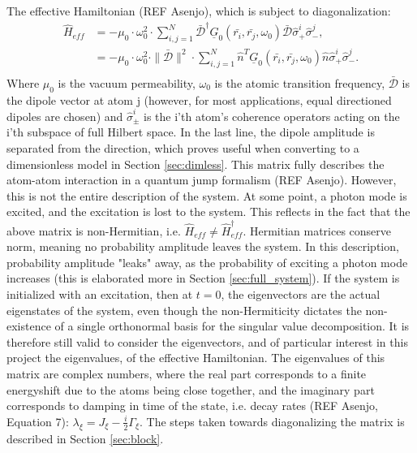 \documentclass{article}
\begin{document}
The effective Hamiltonian (REF Asenjo), which is subject to diagonalization:
\begin{equation}\label{eq:Heff}
    \begin{split}
        \hat{H}_{eff} &= - \mu_0 \cdot \omega_0^2 \cdot \sum_{i,j = 1}^N \bar{\mathscr{D}}^\dagger \underline{G}_0(\bar{r_i}, \bar{r_j}, \omega_0) \bar{\mathscr{D}} \hat{\sigma}_+^i \hat{\sigma}_-^j, \\
        &=- \mu_0 \cdot \omega_0^2 \cdot \|\bar{\mathscr{D}}\|^2 \cdot \sum_{i,j = 1}^N \hat{n}^T \underline{G}_0(\bar{r_i}, \bar{r_j}, \omega_0) \hat{n} \hat{\sigma}_+^i \hat{\sigma}_-^j. \\
    \end{split}
\end{equation}
Where $\mu_0$ is the vacuum permeability, $\omega_0$ is the atomic transition frequency, $\bar{\mathscr{D}}$ is the dipole vector at atom j (however, for most applications, equal directioned dipoles are chosen) and $\hat{\sigma}_\pm^i$ is the i'th atom's coherence operators acting on the i'th subspace of full Hilbert space. In the last line, the dipole amplitude is separated from the direction, which proves useful when converting to a dimensionless model in Section \ref{sec:dimless}. This matrix fully describes the atom-atom interaction in a quantum jump formalism (REF Asenjo). However, this is not the entire description of the system. At some point, a photon mode is excited, and the excitation is lost to the system. This reflects in the fact that the above matrix is non-Hermitian, i.e. $\hat{H}_{eff} \neq \hat{H}_{eff}^\dagger$. Hermitian matrices conserve norm, meaning no probability amplitude leaves the system. In this description, probability amplitude "leaks" away, as the probability of exciting a photon mode increases (this is elaborated more in Section \ref{sec:full_system}). If the system is initialized with an excitation, then at $t=0$, the eigenvectors are the actual eigenstates of the system, even though the non-Hermiticity dictates the non-existence of a single orthonormal basis for the singular value decomposition. It is therefore still valid to consider the eigenvectors, and of particular interest in this project the eigenvalues, of the effective Hamiltonian. The eigenvalues of this matrix are complex numbers, where the real part corresponds to a finite energyshift due to the atoms being close together, and the imaginary part corresponds to damping in time of the state, i.e. decay rates (REF Asenjo, Equation 7): $\lambda_\xi = J_\xi - \frac{i}{2} \Gamma_\xi$. The steps taken towards diagonalizing the matrix is described in Section \ref{sec:block}. 
\end{document}
